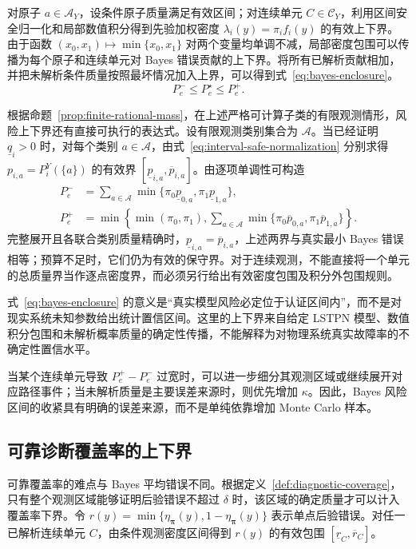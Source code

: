 \documentclass[master,fontset=ubuntu]{shnuthesis}
\theoremstyle{definition}
\begin{document}
对原子 \(a\in\mathcal A_Y\)，设条件原子质量满足有效区间；对连续单元 \(C\in\mathcal C_Y\)，利用区间安全归一化和局部数值积分得到先验加权密度 \(\lambda_i(y)=\pi_i f_i(y)\) 的有效上下界。由于函数 \((x_0,x_1)\mapsto\min\{x_0,x_1\}\) 对两个变量均单调不减，局部密度包围可以传播为每个原子和连续单元对 Bayes 错误贡献的上下界。将所有已解析贡献相加，并把未解析条件质量按照最坏情况加入上界，可以得到式~\eqref{eq:bayes-enclosure}。
\begin{equation}
P_e^-
\leq
P_e^\star
\leq
P_e^+.
\label{eq:bayes-enclosure}
\end{equation}

根据命题~\ref{prop:finite-rational-mass}，在上述严格可计算子类的有限观测情形，风险上下界还有直接可执行的表达式。设有限观测类别集合为 \(\mathcal A\)。当已经证明 \(\underline q_i>0\) 时，对每个类别 \(a\in\mathcal A\)，由式~\eqref{eq:interval-safe-normalization} 分别求得 \(p_{i,a}=P_i^Y(\{a\})\) 的有效界 \([\underline p_{i,a},\overline p_{i,a}]\)。由逐项单调性可构造
\begin{equation}
\begin{aligned}
P_e^-&=\sum_{a\in\mathcal A}\min\{\pi_0\underline p_{0,a},\pi_1\underline p_{1,a}\},\\
P_e^+&=\min\!\left\{\min(\pi_0,\pi_1),\sum_{a\in\mathcal A}\min\{\pi_0\overline p_{0,a},\pi_1\overline p_{1,a}\}\right\}.
\end{aligned}
\label{eq:finite-observation-bayes-bounds}
\end{equation}
完整展开且各联合类别质量精确时，\(\underline p_{i,a}=\overline p_{i,a}\)，上述两界与真实最小 Bayes 错误相等；预算不足时，它们仍为有效的保守界。对于连续观测，不能直接将一个单元的总质量界当作逐点密度界，而必须另行给出有效密度包围及积分外包围规则。

式~\eqref{eq:bayes-enclosure} 的意义是“真实模型风险必定位于认证区间内”，而不是对现实系统未知参数给出统计置信区间。这里的上下界来自给定 LSTPN 模型、数值积分包围和未解析概率质量的确定性传播，不能解释为对物理系统真实故障率的不确定性置信水平。

当某个连续单元导致 \(P_e^+-P_e^-\) 过宽时，可以进一步细分其观测区域或继续展开对应路径事件；当未解析质量是主要误差来源时，则优先增加 \(\kappa\)。因此，Bayes 风险区间的收紧具有明确的误差来源，而不是单纯依靠增加 Monte Carlo 样本。

\subsection{可靠诊断覆盖率的上下界}

可靠覆盖率的难点与 Bayes 平均错误不同。根据定义~\ref{def:diagnostic-coverage}，只有整个观测区域能够证明后验错误不超过 \(\delta\) 时，该区域的确定质量才可以计入覆盖率下界。令
\(r(y)=\min\{\eta_{\boldsymbol\pi}(y),1-\eta_{\boldsymbol\pi}(y)\}\)
表示单点后验错误。对任一已解析连续单元 \(C\)，由条件观测密度区间得到 \(r(y)\) 的有效包围 \([\underline r_C,\overline r_C]\)。
\end{document}
